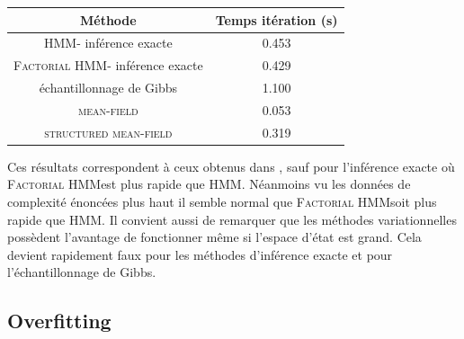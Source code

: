 \documentclass[10pt,a4paper]{article}
\newcommand{\hmm}{\textsc{HMM}}
\newcommand{\fhmm}{\textsc{Factorial HMM}}
\newcommand{\meanfield}{\textsc{mean-field}}
\newcommand{\structmeanfield}{\textsc{structured mean-field}}
\begin{document}
\begin{center}
\begin{tabular}{|c|c|}
\hline
Méthode & Temps itération (s) \\
\hline \hline
\hmm - inférence exacte & 0.453  \\ \hline
\fhmm - inférence exacte & 0.429 \\ \hline
échantillonnage de Gibbs &  1.100 \\ \hline
\meanfield & 0.053 \\ \hline
\structmeanfield & 0.319 \\ \hline
\end{tabular}
\end{center}
Ces résultats correspondent à ceux obtenus dans \cite{ghahramani1997factorial}, sauf pour l'inférence
 exacte où \fhmm est plus rapide que \hmm. Néanmoins vu les données de complexité énoncées plus haut il
  semble normal que \fhmm soit plus rapide que \hmm. Il convient aussi de remarquer que les méthodes
   variationnelles possèdent l'avantage de fonctionner même si l'espace d'état est grand. Cela devient
    rapidement faux pour les méthodes d'inférence exacte et pour l'échantillonnage de Gibbs.
 \subsection{Overfitting}
  
  
\end{document}
